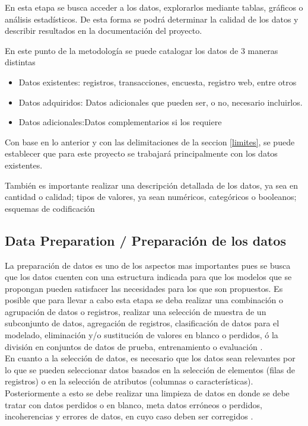 En esta etapa se busca acceder a los datos, explorarlos mediante tablas, gráficos o análisis estadísticos. De esta forma se podrá determinar la calidad de los datos y describir resultados en la documentación del proyecto.

En este punto de la metodología se puede catalogar los datos de 3 maneras distintas
\begin{itemize}
    \item Datos existentes: registros, transacciones, encuesta, registro web, entre otros
    \item Datos adquiridos: Datos adicionales que pueden ser, o no, necesario incluirlos.
    \item Datos adicionales:Datos complementarios si los requiere
\end{itemize}
Con base en lo anterior y con las delimitaciones de la seccion \ref{limites}, se puede establecer que para este proyecto se trabajará principalmente con los datos existentes.

También es importante realizar una descripción detallada de los datos, ya sea en cantidad o calidad; tipos de valores, ya sean numéricos, categóricos o booleanos; esquemas de codificación

\subsection{Data Preparation / Preparación de los datos}
La preparación de datos es uno de los aspectos mas importantes pues se busca que los datos cuenten con una estructura indicada para que los modelos que se propongan pueden satisfacer las necesidades para los que son propuestos. Es posible que para llevar a cabo esta etapa se deba realizar una combinación o agrupación de datos o registros, realizar una selección de muestra de un subconjunto de datos, agregación de registros, clasificación de datos para el modelado, eliminación y/o sustitución de valores en blanco o perdidos, ó la división en conjuntos de datos de prueba, entrenamiento o evaluación \cite{ibmcrisp}.\\

En cuanto a la selección de datos, es necesario que los datos sean relevantes por lo que se pueden seleccionar datos basados en la selección de elementos (filas de registros) o en la selección de atributos (columnas o características). Posteriormente a esto se debe realizar una limpieza de datos en donde se debe tratar con datos perdidos o en blanco, meta datos erróneos o perdidos, incoherencias y errores de datos, en cuyo caso deben ser corregidos \cite{ibmcrisp}.

